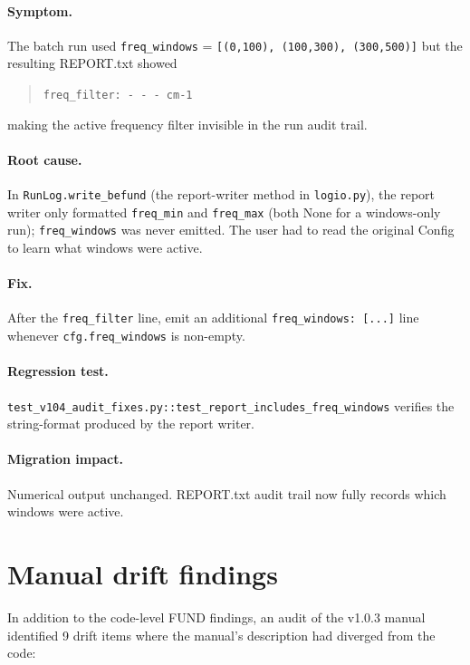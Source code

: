 \documentclass[10pt,a4paper,twoside]{article}
\newcommand{\fn}[1]{\texttt{#1}}
\newcommand{\file}[1]{\texttt{#1}}
\newcommand{\cfgkey}[1]{\texttt{#1}}
\begin{document}
\paragraph{Symptom.}
The batch run used \cfgkey{freq\_windows} =
\texttt{[(0,100), (100,300), (300,500)]} but the resulting
REPORT.txt showed
\begin{quote}
\texttt{freq\_filter: - - - cm-1}
\end{quote}
making the active frequency filter invisible in the run audit
trail.

\paragraph{Root cause.}
In \texttt{RunLog.write\_befund} (the report-writer method in
\file{logio.py}), the report writer only formatted
\cfgkey{freq\_min} and \cfgkey{freq\_max} (both None
for a windows-only run); \cfgkey{freq\_windows} was never
emitted. The user had to read the original Config to learn what
windows were active.

\paragraph{Fix.}
After the \texttt{freq\_filter} line, emit an additional
\texttt{freq\_windows: [...]} line whenever
\fn{cfg.freq\_windows} is non-empty.

\paragraph{Regression test.}
\fn{test\_v104\_audit\_fixes.py::test\_report\_includes\_freq\_windows}
verifies the string-format produced by the report writer.

\paragraph{Migration impact.}
Numerical output unchanged. REPORT.txt audit trail now fully
records which windows were active.

\section{Manual drift findings}
\label{sec:manual-drift}

In addition to the code-level FUND findings, an audit of the
v1.0.3 manual identified 9 drift items where the manual's
description had diverged from the code:
\end{document}
